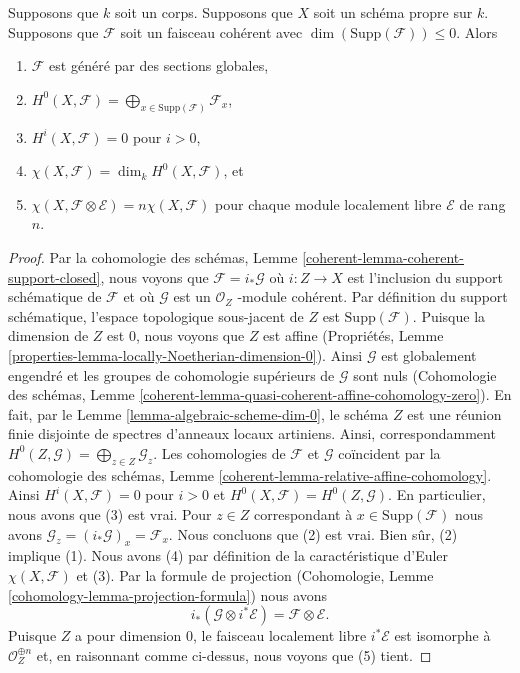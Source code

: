 \begin{lemma}
\label{lemma-chi-tensor-finite}
Supposons que $k$ soit un corps. Supposons que $X$ soit un
schéma propre sur $k$. Supposons que $\mathcal{F}$ soit un
faisceau cohérent avec $\dim(\text{Supp}(\mathcal{F})) \leq 0$. Alors
\begin{enumerate}
\item $\mathcal{F}$ est généré par des sections
globales, \item $H^0(X, \mathcal{F}) =
\bigoplus_{x \in \text{Supp}(\mathcal{F})}
\mathcal{F}_x$, \item $H^i(X, \mathcal{F}) = 0$ pour
$i > 0$, \item $\chi(X, \mathcal{F}) = \dim_k
H^0(X, \mathcal{F})$, et \item $\chi(X, \mathcal{F}
\otimes \mathcal{E}) = n\chi(X, \mathcal{F})$ pour
chaque module localement libre $\mathcal{E}$ de rang $n$.
\end{enumerate}
\end{lemma}

\begin{proof}
Par la cohomologie des schémas, Lemme
\ref{coherent-lemma-coherent-support-closed}, nous voyons que
$\mathcal{F} = i_*\mathcal{G}$ où $i : Z \to X$ est l'inclusion
du support schématique de $\mathcal{F}$ et où $\mathcal{G}$ est
un $\mathcal{O}_Z$ -module cohérent. Par définition du support
schématique, l'espace topologique sous-jacent de $Z$ est
$\text{Supp}(\mathcal{F})$. Puisque la dimension de $Z$ est
$0$, nous voyons que $Z$ est affine (Propriétés, Lemme
\ref{properties-lemma-locally-Noetherian-dimension-0}). Ainsi
$\mathcal{G}$ est globalement engendré et les groupes de
cohomologie supérieurs de $\mathcal{G}$ sont nuls (Cohomologie
des schémas, Lemme
\ref{coherent-lemma-quasi-coherent-affine-cohomology-zero}). En
fait, par le Lemme \ref{lemma-algebraic-scheme-dim-0}, le schéma $Z$
est une réunion finie disjointe de spectres d'anneaux locaux
artiniens. Ainsi, correspondamment $H^0(Z, \mathcal{G}) =
\bigoplus_{z \in Z} \mathcal{G}_z$. Les cohomologies de $\mathcal{F}$
et $\mathcal{G}$ coïncident par la cohomologie des schémas, Lemme
\ref{coherent-lemma-relative-affine-cohomology}. Ainsi $H^i(X,
\mathcal{F}) = 0$ pour $i > 0$ et $H^0(X, \mathcal{F}) = H^0(Z,
\mathcal{G})$. En particulier, nous avons que (3) est vrai. Pour $z \in Z$
correspondant à $x \in \text{Supp}(\mathcal{F})$ nous avons
$\mathcal{G}_z = (i_*\mathcal{G})_x = \mathcal{F}_x$. Nous concluons que (2)
est vrai. Bien sûr, (2) implique (1). Nous avons (4) par définition de la
caractéristique d'Euler $\chi(X, \mathcal{F})$ et (3). Par la formule de
projection (Cohomologie, Lemme \ref{cohomology-lemma-projection-formula}) nous avons
$$
i_*(\mathcal{G} \otimes i^*\mathcal{E}) = \mathcal{F} \otimes \mathcal{E}.
$$
Puisque $Z$ a pour dimension $0$, le faisceau localement
libre $i^*\mathcal{E}$ est isomorphe à $\mathcal{O}_Z^{\oplus
n}$ et, en raisonnant comme ci-dessus, nous voyons que (5) tient.
\end{proof}

